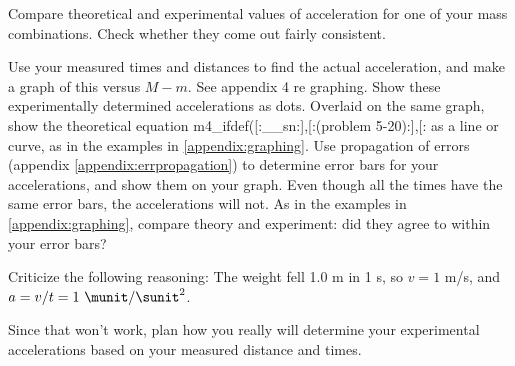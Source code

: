 \selfcheck

Compare theoretical and experimental values of
acceleration for one of your mass combinations.
Check whether they come out fairly consistent.

\analysis

Use your measured times and distances to find the actual
acceleration, and make a graph of this versus $M-m$. 
See appendix 4 re graphing.
Show
these experimentally determined accelerations as dots.
Overlaid on the same graph, show the theoretical
equation %
m4_ifdef([:__sn:],[:(problem 5-20):],[:%
as a line or curve, as in the examples in \ref{appendix:graphing}.
Use propagation of errors (appendix \ref{appendix:errpropagation}) to determine error bars 
for your accelerations, and show them on your graph.
Even though all the times have the same error bars, the accelerations will not.
As in the examples in \ref{appendix:graphing}, compare theory and
experiment: did they agree
to within your error bars?

\prelab

\prelabquestion Criticize the following reasoning: 
The weight fell 1.0
m in 1 s, so $v=1$ m/s, and $a=v/t=1\ \munit/\sunit^2$.

\prelabquestion Since that won't work, plan how you really will
determine your experimental accelerations based on your
measured distance and times.
